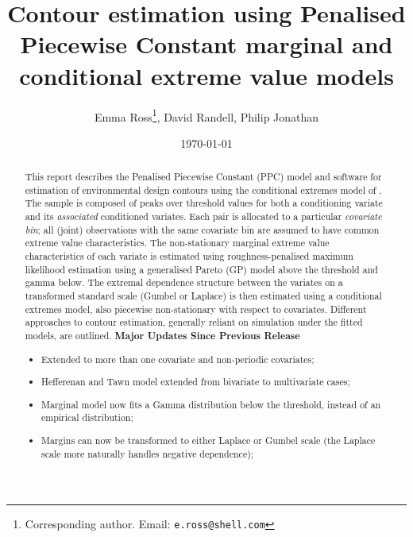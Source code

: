 \documentclass[a4paper,10pt]{article}
\begin{document}
\title{\textbf{Contour estimation using Penalised Piecewise Constant marginal and conditional extreme value models}}
\author{Emma Ross\thanks{Corresponding author. Email: {\tt e.ross@shell.com}}, David Randell, Philip Jonathan}
\date{\today}
\maketitle

\begin{abstract}
	This report describes the Penalised Piecewise Constant (PPC) model and software for estimation of environmental design contours using the conditional extremes model of \cite{HffTwn04}. The sample is composed of peaks over threshold values for both a conditioning variate and its \emph{associated} conditioned variates. Each pair is allocated to a particular \emph{covariate bin}; all (joint) observations with the same covariate bin are assumed to have common extreme value characteristics. The non-stationary marginal extreme value characteristics of each variate is estimated using roughness-penalised maximum likelihood estimation using a generalised Pareto (GP) model above the threshold and gamma below. The extremal dependence structure between the variates on a transformed standard scale (Gumbel or Laplace) is then estimated using a conditional extremes model, also piecewise non-stationary with respect to covariates. Different approaches to contour estimation, generally reliant on simulation under the fitted models, are outlined.
	\newline \newline \newline \newline \newline \newline
	\noindent\textbf{Major Updates Since Previous Release}
	\begin{itemize}
		\item Extended to more than one covariate and non-periodic covariates;
		\item Hefferenan and Tawn model extended from bivariate to multivariate cases; 
		\item Marginal model now fits a Gamma distribution below the threshold, instead of an empirical distribution;
		\item Margins can now be transformed to either Laplace or Gumbel scale (the Laplace scale more naturally handles negative dependence);

\end{itemize}
\end{abstract}
\end{document}
